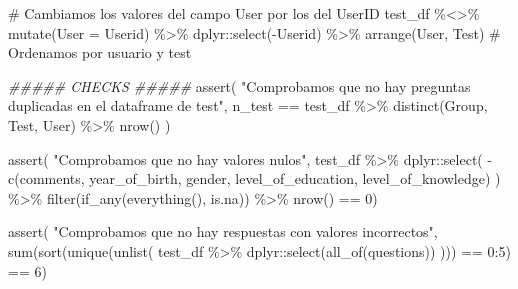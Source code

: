\documentclass[
  12pt,
  a4paper,
  extrafontsizes,
  onecolumn,
  openright]{memoir}
\newenvironment{Shaded}{\begin{snugshade}}{\end{snugshade}}
\newcommand{\AttributeTok}[1]{\textcolor[rgb]{0.40,0.45,0.13}{#1}}
\newcommand{\CommentTok}[1]{\textcolor[rgb]{0.37,0.37,0.37}{#1}}
\newcommand{\DecValTok}[1]{\textcolor[rgb]{0.68,0.00,0.00}{#1}}
\newcommand{\DocumentationTok}[1]{\textcolor[rgb]{0.37,0.37,0.37}{\textit{#1}}}
\newcommand{\FunctionTok}[1]{\textcolor[rgb]{0.28,0.35,0.67}{#1}}
\newcommand{\NormalTok}[1]{\textcolor[rgb]{0.00,0.23,0.31}{#1}}
\newcommand{\SpecialCharTok}[1]{\textcolor[rgb]{0.37,0.37,0.37}{#1}}
\newcommand{\StringTok}[1]{\textcolor[rgb]{0.13,0.47,0.30}{#1}}
\begin{document}
\begin{Shaded}
\begin{Highlighting}[]
\CommentTok{\# Cambiamos los valores del campo User por los del UserID}
\NormalTok{test\_df }\SpecialCharTok{\%\textless{}\textgreater{}\%}
    \FunctionTok{mutate}\NormalTok{(}\AttributeTok{User =}\NormalTok{ Userid) }\SpecialCharTok{\%\textgreater{}\%}
\NormalTok{    dplyr}\SpecialCharTok{::}\FunctionTok{select}\NormalTok{(}\SpecialCharTok{{-}}\NormalTok{Userid) }\SpecialCharTok{\%\textgreater{}\%}
    \FunctionTok{arrange}\NormalTok{(User, Test) }\CommentTok{\# Ordenamos por usuario y test}


\DocumentationTok{\#\#\#\#\# CHECKS \#\#\#\#\#}
\FunctionTok{assert}\NormalTok{(}
    \StringTok{"Comprobamos que no hay preguntas duplicadas en el dataframe de test"}\NormalTok{,}
\NormalTok{    n\_test }\SpecialCharTok{==}\NormalTok{ test\_df }\SpecialCharTok{\%\textgreater{}\%}
    \FunctionTok{distinct}\NormalTok{(Group, Test, User) }\SpecialCharTok{\%\textgreater{}\%}
    \FunctionTok{nrow}\NormalTok{()}
\NormalTok{)}

\FunctionTok{assert}\NormalTok{(}
    \StringTok{"Comprobamos que no hay valores nulos"}\NormalTok{,}
\NormalTok{    test\_df }\SpecialCharTok{\%\textgreater{}\%} 
\NormalTok{    dplyr}\SpecialCharTok{::}\FunctionTok{select}\NormalTok{(}
        \SpecialCharTok{{-}}\FunctionTok{c}\NormalTok{(comments, year\_of\_birth, gender, level\_of\_education, level\_of\_knowledge)}
\NormalTok{    ) }\SpecialCharTok{\%\textgreater{}\%} \FunctionTok{filter}\NormalTok{(}\FunctionTok{if\_any}\NormalTok{(}\FunctionTok{everything}\NormalTok{(), is.na)) }\SpecialCharTok{\%\textgreater{}\%} \FunctionTok{nrow}\NormalTok{() }\SpecialCharTok{==} \DecValTok{0}\NormalTok{)}


\FunctionTok{assert}\NormalTok{(}
    \StringTok{"Comprobamos que no hay respuestas con valores incorrectos"}\NormalTok{,}
    \FunctionTok{sum}\NormalTok{(}\FunctionTok{sort}\NormalTok{(}\FunctionTok{unique}\NormalTok{(}\FunctionTok{unlist}\NormalTok{(}
\NormalTok{        test\_df }\SpecialCharTok{\%\textgreater{}\%}\NormalTok{ dplyr}\SpecialCharTok{::}\FunctionTok{select}\NormalTok{(}\FunctionTok{all\_of}\NormalTok{(questions))}
\NormalTok{    ))) }\SpecialCharTok{==} \DecValTok{0}\SpecialCharTok{:}\DecValTok{5}\NormalTok{) }\SpecialCharTok{==} \DecValTok{6}\NormalTok{)}



\end{Highlighting}
\end{Shaded}
\end{document}
